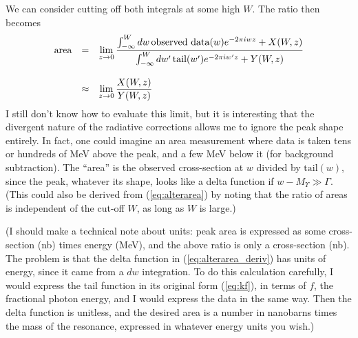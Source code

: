 \documentclass[12pt]{article}
\begin{document}
We can consider cutting off both integrals at some high $W$. The ratio
then becomes
\begin{equation}
  \begin{array}{r c l}
    \mbox{area} &=& \displaystyle \lim_{z \to 0}
      \frac{\int_{-\infty}^W dw\, \mbox{observed data}(w) e^{-2\pi i w z} + X(W,z)}{
      \int_{-\infty}^W dw^{\prime}\, \mbox{tail}(w^{\prime}) e^{-2\pi i w^{\prime} z} + Y(W,z)} \\
      & & \\
                &\approx& \displaystyle \lim_{z \to 0}
      \frac{X(W,z)}{Y(W,z)}
  \end{array}
  \label{eq:alterarea}
\end{equation}
I still don't know how to evaluate this limit, but it is interesting
that the divergent nature of the radiative corrections allows me to
ignore the peak shape entirely. In fact, one could imagine an area
measurement where data is taken tens or hundreds of MeV above the
peak, and a few MeV below it (for background subtraction). The
``area'' is the observed cross-section at $w$ divided by
$\mbox{tail}(w)$, since the peak, whatever its shape, looks like a
delta function if $w - \mbox{$M_\Upsilon$} \gg \Gamma$. (This could
also be derived from (\ref{eq:alterarea}) by noting that the ratio of
areas is independent of the cut-off $W$, as long as $W$ is large.)

(I should make a technical note about units: peak area is expressed as
some cross-section (nb) times energy (MeV), and the above ratio is
only a cross-section (nb). The problem is that the delta function in
(\ref{eq:alterarea_deriv}) has units of energy, since it came from a
$dw$ integration. To do this calculation carefully, I would express
the tail function in its original form (\ref{eq:kf}), in terms of $f$,
the fractional photon energy, and I would express the data in the same
way. Then the delta function is unitless, and the desired area is a
number in nanobarns times the mass of the resonance, expressed in
whatever energy units you wish.)
\end{document}
